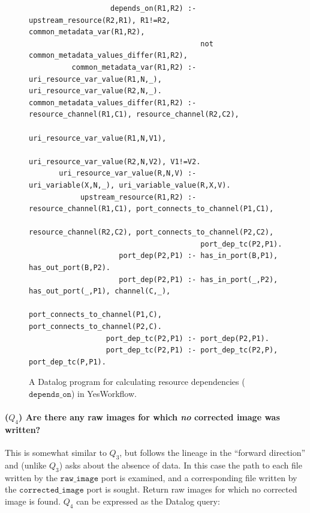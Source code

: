 \documentclass[nocopyrightspace]{sigplanconf}
\newcommand{\code}[1]{\ensuremath{\mathtt{#1}}}
\newcommand{\YW}{\textsf{YesWorkflow}}
\begin{document}
\begin{figure}[!t]
  \begin{footnotesize}
  \begin{verbatim}
                   depends_on(R1,R2) :- upstream_resource(R2,R1), R1!=R2, common_metadata_var(R1,R2), 
                                        not common_metadata_values_differ(R1,R2), 
          common_metadata_var(R1,R2) :- uri_resource_var_value(R1,N,_), uri_resource_var_value(R2,N,_).
common_metadata_values_differ(R1,R2) :- resource_channel(R1,C1), resource_channel(R2,C2), 
                                        uri_resource_var_value(R1,N,V1), 
                                        uri_resource_var_value(R2,N,V2), V1!=V2.
       uri_resource_var_value(R,N,V) :- uri_variable(X,N,_), uri_variable_value(R,X,V).
            upstream_resource(R1,R2) :- resource_channel(R1,C1), port_connects_to_channel(P1,C1), 
                                        resource_channel(R2,C2), port_connects_to_channel(P2,C2), 
                                        port_dep_tc(P2,P1).
                     port_dep(P2,P1) :- has_in_port(B,P1), has_out_port(B,P2).
                     port_dep(P2,P1) :- has_in_port(_,P2), has_out_port(_,P1), channel(C,_), 
                                        port_connects_to_channel(P1,C), port_connects_to_channel(P2,C).
                  port_dep_tc(P2,P1) :- port_dep(P2,P1).
                  port_dep_tc(P2,P1) :- port_dep_tc(P2,P), port_dep_tc(P,P1).
  \end{verbatim}
  \end{footnotesize}
  \caption{A Datalog program for calculating resource dependencies (\code{depends\_on}) in \YW.}
  \label{fig:depends-on}
\end{figure}

\paragraph{($Q_4$)
  Are there any raw images for which \emph{no} corrected image was written?}
This is somewhat similar to $Q_ 3$, but follows the lineage in the
``forward direction'' and (unlike $Q_3$) asks about the absence of %
data.  In this case the path to each file written by the
\code{raw\_image} port is examined, and a corresponding file written
by the \code{corrected\_image} port is sought.  Return raw images for
which no corrected image is found. $Q_4$ can be expressed as the Datalog query:
\end{document}
